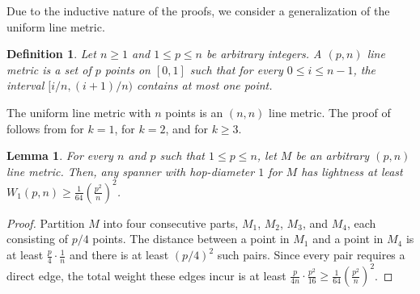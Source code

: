 \documentclass[11pt,english]{article}
\newtheorem{lemma}[theorem]{Lemma}
\newtheorem{definition}[theorem]{Definition}
\begin{document}
Due to the inductive nature of the proofs, we consider a generalization of the uniform line metric. 
\begin{definition}
Let $n \ge 1$ and $1 \le p \le n$ be arbitrary integers. A $(p, n)$ line metric is a set of $p$ points on $[0,1]$ such that for every $0 \le i \le n-1$, the interval $[i/n, (i+1)/n)$ contains at most one point.
\end{definition}

The uniform line metric with $n$ points is an $(n,n)$ line metric. The proof of  follows from  for $k=1$,  for $k=2$, and  for $k \ge 3$.
\begin{lemma}\label{st:lb-1}
For every $n$ and $p$ such that $1 \le p \le n$, let $M$ be an arbitrary $(p,n)$ line metric. Then, any spanner with hop-diameter $1$ for $M$ has lightness at least $W_1(p,n) \ge  \frac{1}{64}\left(\frac{p^2}{n}\right)^2$.
\end{lemma}
\begin{proof}
Partition $M$ into four consecutive parts, $M_1$, $M_2$, $M_3$, and $M_4$, each consisting of $p/4$ points. The distance between a point in $M_1$ and a point in $M_4$ is at least $\frac{p}{4}\cdot\frac{1}{n}$ and there is at least $(p/4)^2$ such pairs. Since every pair requires a direct edge, the total weight these edges incur is at least $\frac{p}{4n}\cdot \frac{p^2}{16}\ge \frac{1}{64}\left(\frac{p^2}{n}\right)^2$. 
\end{proof}
\end{document}
